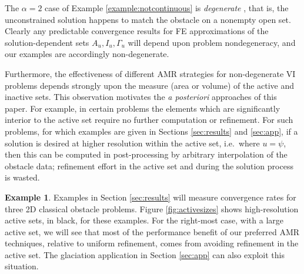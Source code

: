 \documentclass[]{interact}
\theoremstyle{plain}%
\theoremstyle{definition}
\newtheorem{example}[theorem]{Example}
\theoremstyle{remark}
\begin{document}
The $\alpha=2$ case of Example \ref{example:notcontinuous} is \emph{degenerate} \cite{KinderlehrerStampacchia1980}, that is, the unconstrained solution happens to match the obstacle on a nonempty open set.  Clearly any predictable convergence results for FE approximations of the solution-dependent sets $A_u,I_u,\Gamma_u$ will depend upon problem nondegeneracy, and our examples are accordingly non-degenerate.

Furthermore, the effectiveness of different AMR strategies for non-degenerate VI problems depends strongly upon the measure (area or volume) of the active and inactive sets.  This observation motivates the \emph{a posteriori} approaches of this paper.  For example, in certain problems the elements which are significantly interior to the active set require no further computation or refinement.  For such problems, for which examples are given in Sections \ref{sec:results} and \ref{sec:app}, if a solution is desired at higher resolution within the active set, i.e.~where $u=\psi$, then this can be computed in post-processing by arbitrary interpolation of the obstacle data; refinement effort in the active set and during the solution process is wasted.

\begin{example} \label{example:activesets} Examples in Section \ref{sec:results} will measure convergence rates for three 2D classical obstacle problems.  Figure \ref{fig:activesizes} shows high-resolution active sets, in black, for these examples.  For the right-most case, with a large active set, we will see that most of the performance benefit of our preferred AMR techniques, relative to uniform refinement, comes from avoiding refinement in the active set.  The glaciation application in Section \ref{sec:app} can also exploit this situation. \end{example}
\end{document}
